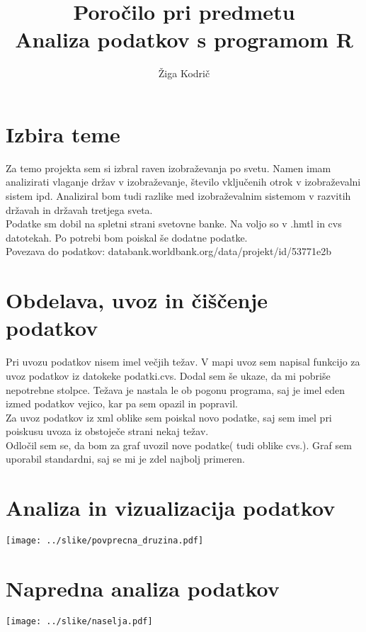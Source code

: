 \documentclass[11pt,a4paper]{article}
\begin{document}
\title{Poročilo pri predmetu \\
Analiza podatkov s programom R}
\author{Žiga Kodrič}
\maketitle

\section{Izbira teme}
Za temo projekta sem si izbral raven izobraževanja po svetu. Namen imam analizirati vlaganje držav v izobraževanje, število vključenih otrok v izobraževalni sistem ipd. Analiziral bom tudi razlike med izobraževalnim sistemom v razvitih državah in državah tretjega sveta.
\\
Podatke sm dobil na spletni strani svetovne banke. Na voljo so v .hmtl in cvs datotekah. Po potrebi bom poiskal še dodatne podatke.
\\
Povezava do podatkov: databank.worldbank.org/data/projekt/id/53771e2b
\section{Obdelava, uvoz in čiščenje podatkov}
Pri uvozu podatkov nisem imel večjih težav. V mapi uvoz sem napisal funkcijo za uvoz podatkov iz datokeke podatki.cvs. Dodal sem še ukaze, da mi pobriše nepotrebne stolpce. Težava je nastala le ob pogonu programa, saj je imel eden izmed podatkov vejico, kar pa sem opazil in popravil. \\
Za uvoz podatkov iz xml oblike sem poiskal novo podatke, saj sem imel pri poiskusu uvoza iz obstoječe strani nekaj težav. \\
Odločil sem se, da bom za graf uvozil nove podatke( tudi oblike cvs.). Graf sem uporabil standardni, saj se mi je zdel najbolj primeren.
\section{Analiza in vizualizacija podatkov}

\texttt{[image: ../slike/povprecna\_druzina.pdf]}

\section{Napredna analiza podatkov}

\texttt{[image: ../slike/naselja.pdf]}
\end{document}
